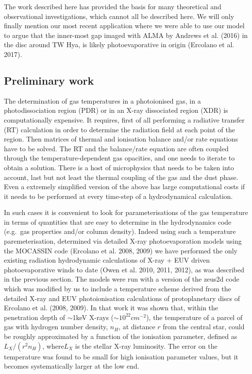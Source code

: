 \documentclass[10pt,fleqn,twoside]{article}
\begin{document}
The work described here has provided the basis for many theoretical
and observational investigations, which cannot all be described
here. We will only finally mention our most recent application where
we were able to use our model to argue that the inner-most gap imaged
with ALMA by Andrews et al. (2016) in the disc around TW Hya, is
likely photoevaporative in origin (Ercolano et al. 2017). 

\subsection{Preliminary work}

The determination of gas temperatures in a photoionised gas, in a
photodissociation region (PDR) or in an X-ray dissociated region (XDR)
is computationally expensive. It requires, first of all 
performing a radiative transfer (RT) calculation in order to determine the
radiation field at each point of the region. Then matrices of thermal and
ionisation balance and/or rate equations have to be solved. The RT and
the balance/rate equation are often coupled through the
temperature-dependent gas opacities, and one needs to iterate to
obtain a solution. There is a host of microphysics
that needs to be taken into account, last but not least the thermal
coupling of the gas and the dust phase. Even a extremely simplified
version of the above has large computational costs if it needs to be performed at
every time-step of a hydrodynamical calculation. 

In such cases it is convenient to look for parameterisations of the
gas temperature in terms of quantities that are easy to determine in
the hydrodynamics code (e.g.\ gas properties and/or column density). 
Indeed using such a temperature paremeterisation,
determined via detailed X-ray photoevaporation models using the
MOCASSIN code (Ercolano et al. 2008, 2009) we have performed the
only existing radiation hydrodynamic 
calculations of X-ray + EUV driven photoevaporative winds to date (Owen et
al. 2010, 2011, 2012), as was described in the previous section. The models were run with a version of the {\sc
  zeus2d} code which was modified by us to include a temperature
scheme derived from the detailed X-ray and EUV photoionisation
calculations of protoplanetary discs of Ercolano et al. (2008,
2009). In that work it was shown that, within the
penetration depth of $\sim$1keV X-rays ($\sim 10^{22}cm^{-2}$), the
temperature of a parcel of gas with hydrogen number density, $n_H$, at
distance $r$ from the central star, could be roughly approximated by a
function of the ionisation parameter, defined as $L_X/(r^2 n_H)$,
where$L_X$ is the stellar X-ray luminosity. The error on the
temperature was found to be small for high ionisation parameter values, but it
becomes systematically larger at the low end. 
\end{document}
